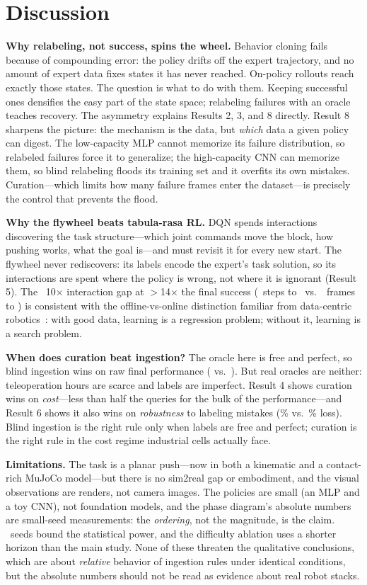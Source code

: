 \documentclass[conference]{IEEEtran}
\begin{document}
\section{Discussion}
\textbf{Why relabeling, not success, spins the wheel.} Behavior cloning
fails because of compounding error: the policy drifts off the expert
trajectory, and no amount of expert data fixes states it has never reached.
On-policy rollouts reach exactly those states. The question is what to do
with them. Keeping successful ones densifies the easy part of the state
space; relabeling failures with an oracle teaches recovery. The asymmetry
explains Results 2, 3, and 8 directly. Result 8 sharpens the picture:
the mechanism is the data, but \emph{which} data a given policy can
digest. The low-capacity MLP cannot memorize its failure distribution, so
relabeled failures force it to generalize; the high-capacity CNN can
memorize them, so blind relabeling floods its training set and it overfits
its own mistakes. Curation---which limits how many failure frames enter
the dataset---is precisely the control that prevents the flood.

\textbf{Why the flywheel beats tabula-rasa RL.} DQN spends interactions
discovering the task structure---which joint commands move the block, how
pushing works, what the goal is---and must revisit it for every new start.
The flywheel never rediscovers: its labels encode the expert's task
solution, so its interactions are spent where the policy is wrong, not
where it is ignorant (Result 5). The ~10$\times$ interaction gap at
$>$14$\times$ the final success (\dqnSteps\ steps to \dqnFinal\ vs.\
\flywheelSteps\ frames to \relabelFinal) is consistent with the
offline-vs-online distinction familiar from
data-centric robotics~\cite{fu2020d4rl}: with good data, learning is a
regression problem; without it, learning is a search problem.

\textbf{When does curation beat ingestion?} The oracle here is free and
perfect, so blind ingestion wins on raw final performance (\relabelFinal
vs.\ \curatedFinal). But real oracles are neither: teleoperation hours are
scarce and labels are imperfect. Result 4 shows curation wins on
\emph{cost}---less than half the queries for the bulk of the
performance---and Result 6 shows it also wins on \emph{robustness} to
labeling mistakes (\curatedDrop\% vs.\ \blindDrop\% loss). Blind
ingestion is the right rule only when labels are free and perfect;
curation is the right rule in the cost regime industrial cells actually
face.

\textbf{Limitations.} The task is a planar push---now in both a kinematic
and a contact-rich MuJoCo model---but there is no sim2real gap or
embodiment, and the visual observations are renders, not camera images.
The policies are small (an MLP and a toy CNN), not foundation models, and
the phase diagram's absolute numbers are small-seed measurements: the
\emph{ordering}, not the magnitude, is the claim. \numSeeds\ seeds bound the statistical power, and the
difficulty ablation uses a shorter horizon than the main study. None of
these threaten the qualitative conclusions, which are about
\emph{relative} behavior of ingestion rules under identical conditions,
but the absolute numbers should not be read as evidence about real robot
stacks.
\end{document}
